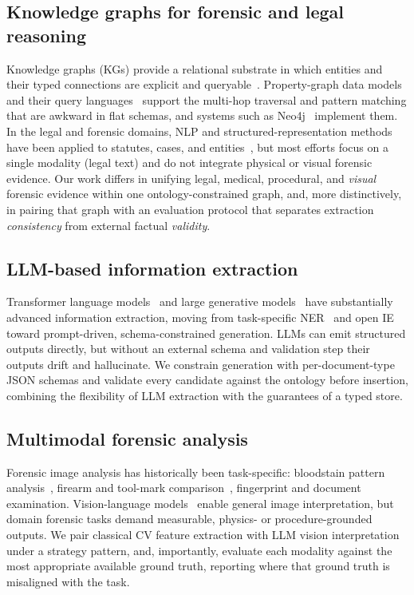 \documentclass[conference]{IEEEtran}
\begin{document}
\subsection{Knowledge graphs for forensic and legal reasoning}
Knowledge graphs (KGs) provide a relational substrate in which entities and
their typed connections are explicit and queryable~\cite{hogan2021kg,ji2021kgsurvey}.
Property-graph data models and their query languages~\cite{angles2017foundations}
support the multi-hop traversal and pattern matching that are awkward in flat
schemas, and systems such as Neo4j~\cite{neo4j} implement them. In the legal and
forensic domains, NLP and structured-representation methods have been applied to
statutes, cases, and entities~\cite{legalkg2023,chalkidis2020legalbert}, but most
efforts focus on a single modality (legal text) and do not integrate physical or
visual forensic evidence. Our work differs in unifying legal, medical, procedural, and
\emph{visual} forensic evidence within one ontology-constrained graph, and, more
distinctively, in pairing that graph with an evaluation protocol that separates
extraction \emph{consistency} from external factual \emph{validity}.

\subsection{LLM-based information extraction}
Transformer language models~\cite{vaswani2017attention,devlin2019bert} and
large generative models~\cite{brown2020gpt3,openai2023gpt4} have substantially
advanced information extraction, moving from task-specific NER~\cite{ner2003conll}
and open IE~\cite{banko2007openie} toward prompt-driven, schema-constrained
generation. LLMs can emit structured outputs directly, but without an external
schema and validation step their outputs drift and hallucinate. We constrain
generation with per-document-type JSON schemas and validate every candidate
against the ontology before insertion, combining the flexibility of LLM
extraction with the guarantees of a typed store.

\subsection{Multimodal forensic analysis}
Forensic image analysis has historically been task-specific: bloodstain pattern
analysis~\cite{attinger2018bloodstain,swgstain}, firearm and tool-mark
comparison~\cite{afte}, fingerprint and document examination. Vision-language
models~\cite{radford2021clip} enable general image interpretation, but
domain forensic tasks demand measurable, physics- or procedure-grounded outputs.
We pair classical CV feature extraction with LLM vision interpretation under a
strategy pattern, and, importantly, evaluate each modality against the most
appropriate available ground truth, reporting where that ground truth is
misaligned with the task.
\end{document}

